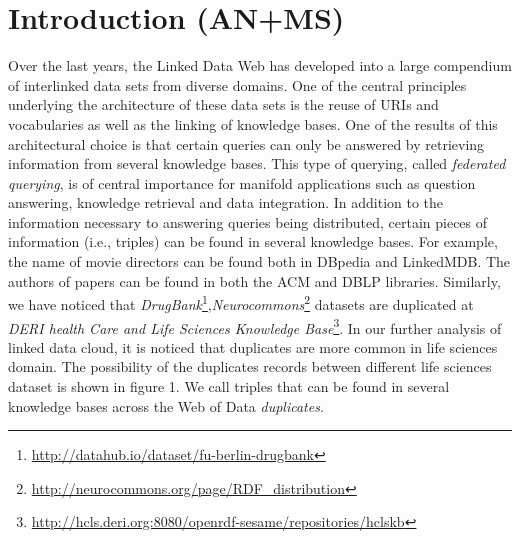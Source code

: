 \documentclass{sig-alternate}  %
\begin{document}
\section{Introduction (AN+MS)}
Over the last years, the Linked Data Web has developed into a large compendium of interlinked data sets from diverse domains\cite{key-14}. 
One of the central principles underlying the architecture of these data sets is the reuse of URIs and vocabularies as well as the linking of knowledge bases\cite{key-20}.
One of the results of this architectural choice is that certain queries can only be answered by retrieving information from several knowledge bases.
This type of querying, called \emph{federated querying}, is of central importance for manifold applications such as question answering, knowledge retrieval and data integration.
In addition to the information necessary to answering queries being distributed, certain pieces of information (i.e., triples) can be found in several knowledge bases. 
For example, the name of movie directors can be found both in DBpedia and LinkedMDB.
 The authors of papers can be found in both the ACM and DBLP libraries. Similarly, we have noticed that \emph{DrugBank}\footnote{\url{http://datahub.io/dataset/fu-berlin-drugbank}},\emph{Neurocommons}\footnote{\url{http://neurocommons.org/page/RDF_distribution}} datasets are duplicated at \emph{DERI health Care and Life Sciences Knowledge Base}\footnote{\url{http://hcls.deri.org:8080/openrdf-sesame/repositories/hclskb}}. In our further analysis of linked data cloud, it is noticed that duplicates are more common in life sciences domain. The possibility of the duplicates records between different life sciences dataset is shown in figure 1. 
We call triples that can be found in several knowledge bases across the Web of Data \emph{duplicates}.
\end{document}
